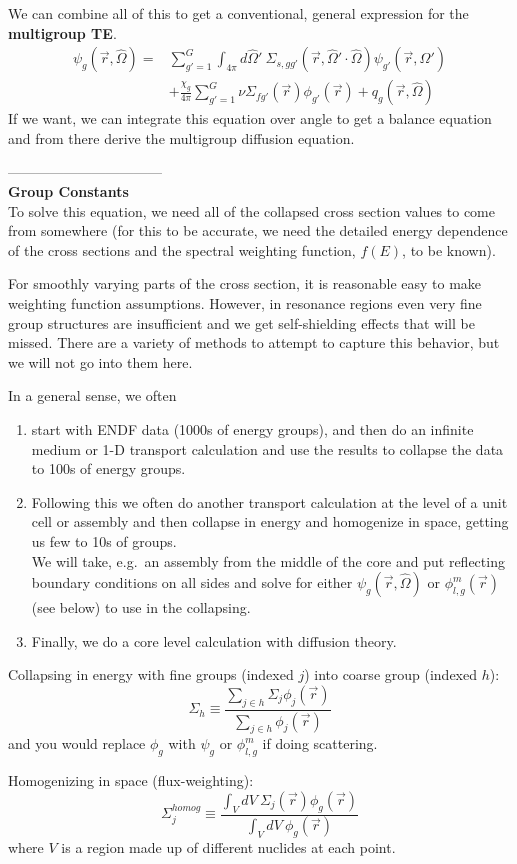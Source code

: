 \documentclass[12pt]{article}
\newcommand{\vecr}{\ensuremath{\vec{r}}}
\newcommand{\vOmega}{\ensuremath{\hat{\Omega}}}
\begin{document}
%
We can combine all of this to get a conventional, general expression for the \textbf{multigroup TE}.
\begin{align*}
[\vOmega \cdot \nabla + \Sigma_{tg}(\vec{r})]\psi_g(\vec{r}, \vOmega) =&  \sum_{g'=1}^G \int_{4 \pi} d\vOmega'\: \Sigma_{s,gg'}(\vecr, \vOmega' \cdot \vOmega) \psi_{g'}(\vec{r}, \vOmega')\\
&+\frac{\chi_g}{4 \pi}\sum_{g'=1}^G \nu\Sigma_{fg'}(\vec{r}) \phi_{g'}(\vec{r}) + q_g(\vec{r}, \vOmega)
\end{align*}
If we want, we can integrate this equation over angle to get a balance equation and from there derive the multigroup diffusion equation.

---------------------------------\\
\textbf{Group Constants}\\
To solve this equation, we need all of the collapsed cross section values to come from somewhere (for this to be accurate, we need the detailed energy dependence of the cross sections and the spectral weighting function, $f(E)$, to be known). 

For smoothly varying parts of the cross section, it is reasonable easy to make weighting function assumptions. However, in resonance regions even very fine group structures are insufficient and we get self-shielding effects that will be missed. There are a variety of methods to attempt to capture this behavior, but we will not go into them here.

In a general sense, we often 
\begin{enumerate}
\item start with ENDF data (1000s of energy groups), and then do an infinite medium or 1-D transport calculation and use the results to collapse the data to 100s of energy groups.

\item Following this we often do another transport calculation at the level of a unit cell or assembly and then collapse in energy and homogenize in space, getting us few to 10s of groups.\\
We will take, e.g.\ an assembly from the middle of the core and put reflecting boundary conditions on all sides and solve for either $\psi_g(\vec{r}, \vOmega)$ or $\phi_{l,g}^m(\vec{r})$ (see below) to use in the collapsing.

\item Finally, we do a core level calculation with diffusion theory. 
\end{enumerate}

Collapsing in energy with fine groups (indexed $j$) into coarse group (indexed $h$):
\[
\Sigma_{h} \equiv \frac{\sum_{j \in h} \Sigma_{j} \phi_j(\vec{r})}{\sum_{j\in h} \phi_j(\vec{r})}
\]
and you would replace $\phi_g$ with $\psi_g$ or $\phi_{l,g}^m$ if doing scattering. 

Homogenizing in space (flux-weighting):
\[
\Sigma_j^{homog} \equiv \frac{\int_V dV \: \Sigma_j(\vec{r}) \phi_g(\vec{r})}{\int_V dV \: 
\phi_g(\vec{r})}
\]
where $V$ is a region made up of different nuclides at each point. 
\end{document}
